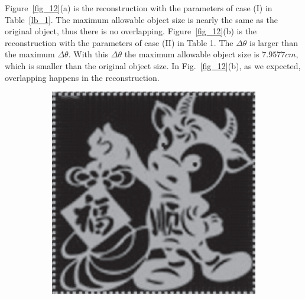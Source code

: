 \documentclass[10pt,letterpaper]{article}
\begin{document}
Figure~\ref{fig_12}(a) is the reconstruction with the parameters of case (I) in Table~\ref{lb_1}. The maximum allowable object size is nearly the same as the original object, thus there is no overlapping. Figure~\ref{fig_12}(b) is the reconstruction with the parameters of case (II) in Table 1. The $\Delta\theta$ is larger than the maximum $\Delta\theta$. With this $\Delta\theta$ the maximum allowable object size is $7.9577cm$, which is smaller than the original object size. In Fig.~\ref{fig_12}(b), as we expected, overlapping happens in the reconstruction. 
\begin{figure}[htbp]
  \centering
  \captionsetup[subfigure]{justification=centering}
  \begin{subfigure}[b]{0.22\linewidth}
  \centering
  \includegraphics[width=1\columnwidth]{cow_overlapping_0}
  \caption{}
  \end{subfigure}
  \begin{subfigure}[b]{0.22\linewidth}

\end{subfigure}
\end{figure}
\end{document}
